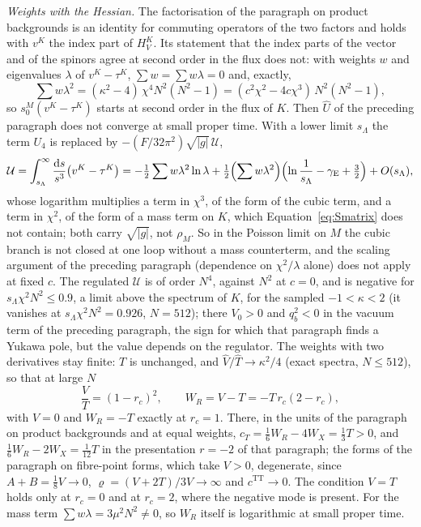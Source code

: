 \emph{Weights with the Hessian.} The factorisation of the paragraph on product backgrounds is an identity for commuting operators of the two factors and holds with \(v^K\) the index part of \(H_V^K\). Its statement that the index parts of the vector and of the spinors agree at second order in the flux does not: with weights \(w\) and eigenvalues \(\lambda\) of \(v^K-\tau^K\), \(\sum w=\sum w\lambda=0\) and, exactly,
\[
  \sum w\lambda^2=(\kappa^2-4)\,\chi^4N^2(N^2-1)=(c^2\chi^2-4c\chi^3)\,N^2(N^2-1),
\]
so \(s_0^M(v^K-\tau^K)\) starts at second order in the flux of \(K\). Then \(\hat U\) of the preceding paragraph does not converge at small proper time. With a lower limit \(s_\Lambda\) the term \(U_4\) is replaced by \(-(F/32\pi^2)\sqrt{|g|}\,\mathcal U\),
\[
  \mathcal U=\int_{s_\Lambda}^\infty\frac{\mathrm ds}{s^3}\bigl(v^K-\tau^K\bigr)
  =-\tfrac12\sum w\lambda^2\ln\lambda+\tfrac12\Bigl(\sum w\lambda^2\Bigr)\Bigl(\ln\frac1{s_\Lambda}-\gamma_{\mathrm E}+\tfrac32\Bigr)+O(s_\Lambda),
\]
whose logarithm multiplies a term in \(\chi^3\), of the form of the cubic term, and a term in \(\chi^2\), of the form of a mass term on \(K\), which Equation~\eqref{eq:Smatrix} does not contain; both carry \(\sqrt{|g|}\), not \(\rho_M\). So in the Poisson limit on \(M\) the cubic branch is not closed at one loop without a mass counterterm, and the scaling argument of the preceding paragraph (dependence on \(\chi^2/\lambda\) alone) does not apply at fixed \(c\). The regulated \(\mathcal U\) is of order \(N^4\), against \(N^2\) at \(c=0\), and is negative for \(s_\Lambda\chi^2N^2\le0.9\), a limit above the spectrum of \(K\), for the sampled \(-1<\kappa<2\) (it vanishes at \(s_\Lambda\chi^2N^2=0.926\), \(N=512\)); there \(V_0>0\) and \(q_b^2<0\) in the vacuum term of the preceding paragraph, the sign for which that paragraph finds a Yukawa pole, but the value depends on the regulator. The weights with two derivatives stay finite: \(T\) is unchanged, and \(\hat V/\hat T\to\kappa^2/4\) (exact spectra, \(N\le512\)), so that at large \(N\)
\[
  \frac VT=(1-r_c)^2,\qquad W_R=V-T=-T\,r_c(2-r_c),
\]
with \(V=0\) and \(W_R=-T\) exactly at \(r_c=1\). There, in the units of the paragraph on product backgrounds and at equal weights, \(c_T=\tfrac16W_R-4W_X=\tfrac13T>0\), and \(\tfrac16W_R-2W_X=\tfrac1{12}T\) in the presentation \(r=-2\) of that paragraph; the forms of the paragraph on fibre-point forms, which take \(V>0\), degenerate, since \(A+B=\tfrac18V\to0\), \(\varrho=(V+2T)/3V\to\infty\) and \(c^{\mathrm{TT}}\to0\). The condition \(V=T\) holds only at \(r_c=0\) and at \(r_c=2\), where the negative mode is present. For the mass term \(\sum w\lambda=3\mu^2N^2\ne0\), so \(W_R\) itself is logarithmic at small proper time.


